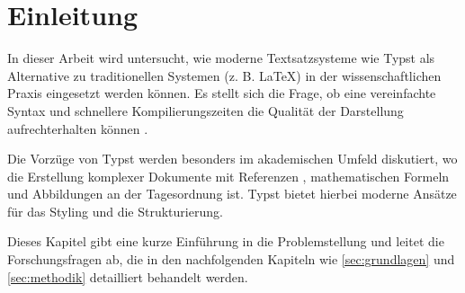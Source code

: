 \section{Einleitung}
\label{sec:einleitung}

In dieser Arbeit wird untersucht, wie moderne Textsatzsysteme wie Typst als Alternative zu traditionellen Systemen (z. B. LaTeX) in der wissenschaftlichen Praxis eingesetzt werden können. Es stellt sich die Frage, ob eine vereinfachte Syntax und schnellere Kompilierungszeiten die Qualität der Darstellung aufrechterhalten können \cite{sagan_1993}.

Die Vorzüge von Typst werden besonders im akademischen Umfeld diskutiert, wo die Erstellung komplexer Dokumente mit Referenzen \cite{imt_software_wiki}, mathematischen Formeln und Abbildungen an der Tagesordnung ist. Typst bietet hierbei moderne Ansätze für das Styling und die Strukturierung.

Dieses Kapitel gibt eine kurze Einführung in die Problemstellung und leitet die Forschungsfragen ab, die in den nachfolgenden Kapiteln wie \ref{sec:grundlagen} und \ref{sec:methodik} detailliert behandelt werden.
